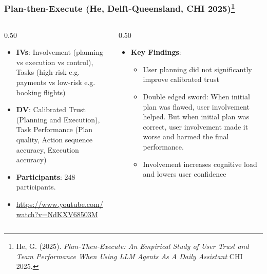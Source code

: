 \documentclass{beamer}
\begin{document}
\begin{frame}
    \frametitle{Plan-then-Execute (He, Delft-Queensland, CHI 2025)\footnote{\tiny He, G. (2025). \textit{Plan-Then-Execute: An Empirical Study of User Trust and Team Performance When Using LLM Agents As A Daily Assistant} CHI 2025.}}
    \footnotesize
    \begin{columns}
        \begin{column}{0.50\textwidth}
        \vspace{-1.5em}
            \begin{itemize}
                \item \textbf{IVs}: Involvement (planning vs execution vs control), Tasks (high-risk e.g. payments vs low-risk e.g. booking flights)
                \item \textbf{DV}: Calibrated Trust (Planning and Execution), Task Performance (Plan quality, Action sequence accuracy, Execution accuracy)
                \item \textbf{Participants}: 248 participants.
                \item \url{https://www.youtube.com/watch?v=NdKXV68503M}
            \end{itemize}
        \end{column}
        
        \begin{column}{0.50\textwidth}
            \begin{itemize}
                \item \textbf{Key Findings}:
                \begin{itemize}
                \scriptsize
                \item User planning did not significantly improve calibrated trust 
                \item Double edged sword: When initial plan was flawed, user involvement helped. But when initial plan was correct, user involvement made it worse and harmed the final performance. 
                \item Involvement increases cognitive load and lowers user confidence
                \end{itemize}
            \end{itemize}
        \end{column}
    \end{columns}
\end{frame}
\end{document}
